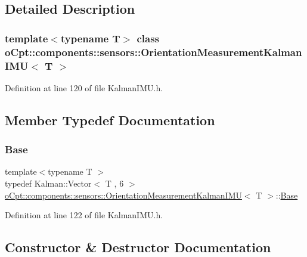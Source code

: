 \subsection{Detailed Description}
\subsubsection*{template$<$typename T$>$\newline
class o\+Cpt\+::components\+::sensors\+::\+Orientation\+Measurement\+Kalman\+I\+M\+U$<$ T $>$}



Definition at line 120 of file Kalman\+I\+M\+U.\+h.



\subsection{Member Typedef Documentation}
\hypertarget{classo_cpt_1_1components_1_1sensors_1_1_orientation_measurement_kalman_i_m_u_a14a44abdb42af2988bed26e3d6a3a5d4}{}\label{classo_cpt_1_1components_1_1sensors_1_1_orientation_measurement_kalman_i_m_u_a14a44abdb42af2988bed26e3d6a3a5d4} 
\subsubsection{\texorpdfstring{Base}{Base}}
{\footnotesize\ttfamily template$<$typename T $>$ \\
typedef Kalman\+::\+Vector$<$ T , 6 $>$ \hyperlink{classo_cpt_1_1components_1_1sensors_1_1_orientation_measurement_kalman_i_m_u}{o\+Cpt\+::components\+::sensors\+::\+Orientation\+Measurement\+Kalman\+I\+MU}$<$ T $>$\+::\hyperlink{classo_cpt_1_1components_1_1sensors_1_1_orientation_measurement_kalman_i_m_u_a14a44abdb42af2988bed26e3d6a3a5d4}{Base}}



Definition at line 122 of file Kalman\+I\+M\+U.\+h.



\subsection{Constructor \& Destructor Documentation}
\hypertarget{classo_cpt_1_1components_1_1sensors_1_1_orientation_measurement_kalman_i_m_u_a8b369e5faee580013a25988d096f2c93}{}\label{classo_cpt_1_1components_1_1sensors_1_1_orientation_measurement_kalman_i_m_u_a8b369e5faee580013a25988d096f2c93} 
